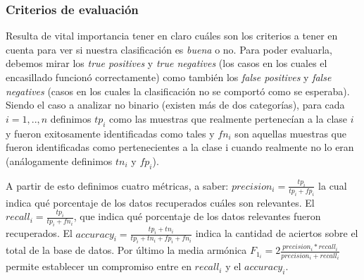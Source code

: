 \subsubsection*{Criterios de evaluaci\'on}
Resulta de vital importancia tener en claro cu\'ales son los criterios a tener en cuenta para ver si nuestra clasificaci\'on es \textit{buena} o no.
Para poder evaluarla, debemos mirar los \textit{true positives} y \textit{true negatives} (los casos en los cuales el encasillado funcion\'o correctamente)
como tambi\'en los \textit{false positives} y \textit{false negatives} (casos en los cuales la clasificaci\'on no se comport\'o como se esperaba).\\
Siendo el caso a analizar no binario (existen m\'as de dos categor\'ias), para cada $i = 1,..,n$  definimos $tp_i$ como
las muestras que realmente pertenec\'ian a la clase $i$ y fueron exitosamente identificadas como tales
y $fn_i$ son aquellas muestras que fueron identificadas como pertenecientes a la clase i cuando realmente no lo eran (an\'alogamente definimos $tn_i$ y $fp_i$).
\par A partir de esto definimos cuatro m\'etricas, a saber:
$precision_i= \frac{tp_i}{tp_i + fp_i}$ la cual indica qu\'e porcentaje de los datos recuperados cu\'ales son relevantes. 
El $recall_i= \frac{tp_i}{tp_i + fn_i}$, que indica qu\'e porcentaje de los datos relevantes fueron recuperados.
El $accuracy_i = \frac{tp_i+tn_i}{tp_i + tn_i + fp_i + fn_i}$ indica la cantidad de aciertos sobre el total de la base de datos.
Por \'ultimo la media arm\'onica $F_{1_i} = 2\frac{precision_i * recall_i}{precision_i + recall_i}$ permite establecer un compromiso entre en 
$recall_i$ y el $accuracy_i$.